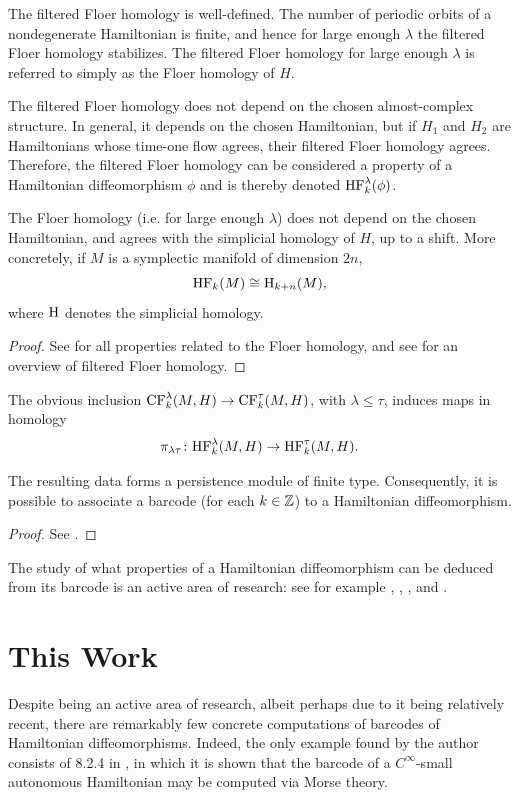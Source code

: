 \begin{prop}
The filtered Floer homology is well-defined. The number of periodic orbits of a nondegenerate Hamiltonian is finite, and hence for large enough $\lambda$ the filtered Floer homology stabilizes. The filtered Floer homology for large enough $\lambda$ is referred to simply as the Floer homology of $H$.

The filtered Floer homology does not depend on the chosen almost-complex structure. In general, it depends on the chosen Hamiltonian, but if $H_1$ and $H_2$ are Hamiltonians whose time-one flow agrees, their filtered Floer homology agrees. Therefore, the filtered Floer homology can be considered a property of a Hamiltonian diffeomorphism $\phi$ and is thereby denoted $\mathrm{HF}_k^\lambda(\phi)$.

The Floer homology (i.e. for large enough $\lambda$) does not depend on the chosen Hamiltonian, and agrees with the simplicial homology of $H$, up to a shift. More concretely, if $M$ is a symplectic manifold of dimension $2n$,
\begin{equation}
\mathrm{HF}_k(M) \cong \mathrm{H}_{k+n}(M),
\end{equation}
where $\mathrm{H}$ denotes the simplicial homology.
\end{prop}

\begin{proof}
See \cite{audin} for all properties related to the Floer homology, and see \cite{polterovich} for an overview of filtered Floer homology.
\end{proof}

\begin{prop}
The obvious inclusion $\mathrm{CF}_k^\lambda(M,H) \to \mathrm{CF}_k^\tau(M,H)$, with $\lambda \leq \tau$, induces maps in homology
\begin{equation}
\pi_{\lambda\tau} \colon \mathrm{HF}_k^\lambda(M,H) \to \mathrm{HF}_k^\tau(M,H).
\end{equation}

The resulting data forms a persistence module of finite type. Consequently, it is possible to associate a barcode (for each $k \in \mathbb{Z}$) to a Hamiltonian diffeomorphism.
\end{prop}

\begin{proof}
See \cite{polterovich}.
\end{proof}

The study of what properties of a Hamiltonian diffeomorphism can be deduced from its barcode is an active area of research: see for example \cite{polterovich}, \cite{kislev2022bounds}, \cite{roux2018barcodes}, and \cite{polterovich2016autonomous}.

\section{This Work}

Despite being an active area of research, albeit perhaps due to it being relatively recent, there are remarkably few concrete computations of barcodes of Hamiltonian diffeomorphisms. Indeed, the only example found by the author consists of 8.2.4 in \cite{polterovich}, in which it is shown that the barcode of a $C^\infty$-small autonomous Hamiltonian may be computed via Morse theory.
